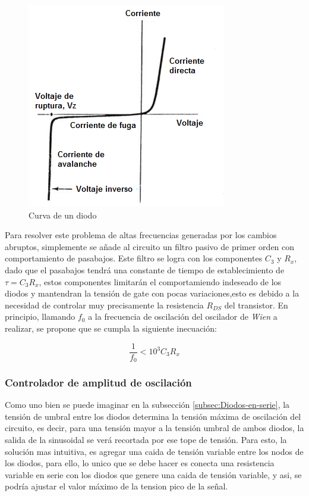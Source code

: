 \begin{figure}[H]
\begin{centering}
\includegraphics[scale=0.5]{../Ex1/Resources/Diodo}
\par\end{centering}
\caption{Curva de un diodo}
\label{1_6}

\end{figure}

Para resolver este problema de altas frecuencias generadas por los
cambios abruptos, simplemente se añade al circuito un filtro pasivo
de primer orden con comportamiento de pasabajos. Este filtro se logra
con los componentes $C_{3}$ y $R_{x}$, dado que el pasabajos tendrá
una constante de tiempo de establecimiento de $\tau=C_{3}R_{x}$,
estos componentes limitarán el comportamiendo indeseado de los diodos
y mantendran la tensión de gate con pocas variaciones,esto es debido
a la necesidad de controlar muy precisamente la resistencia $R_{DS}$
del transistor. En principio, llamando $f_{0}$ a la frecuencia de
oscilación del oscilador de \emph{Wien }a realizar, se propone que
se cumpla la siguiente inecuación:

\begin{equation}
\frac{1}{f_{0}}<10^{3}C_{3}R_{x}\label{eq:1_3}
\end{equation}

\subsubsection{Controlador de amplitud de oscilación}

Como uno bien se puede imaginar en la subsección \ref{subsec:Diodos-en-serie},
la tensión de umbral entre los diodos determina la tensión máxima
de oscilación del circuito, es decir, para una tensión mayor a la
tensión umbral de ambos diodos, la salida de la sinusoidal se verá
recortada por ese tope de tensión. Para esto, la solución mas intuitiva,
es agregar una caida de tensión variable entre los nodos de los diodos,
para ello, lo unico que se debe hacer es conecta una resistencia variable
en serie con los diodos que genere una caida de tensión variable,
y asi, se podría ajustar el valor máximo de la tension pico de la
señal.

